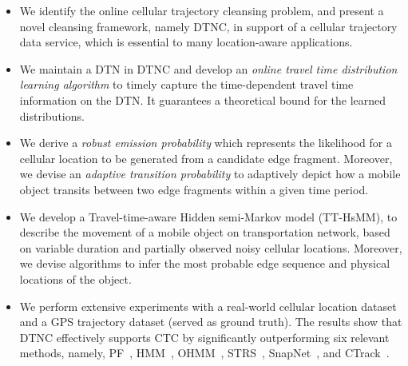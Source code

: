 \documentclass{vldb}
\begin{document}
	
	\begin{itemize}
		\setlength\itemsep{0em}
		\item We identify the online cellular trajectory cleansing problem, and present a novel cleansing framework, namely DTNC, in support of a cellular trajectory data service, which is essential to many location-aware applications.
		\item We maintain a DTN in DTNC and develop an {\it online travel time distribution learning algorithm} to timely capture the time-dependent travel time information on the DTN.
		It guarantees a theoretical bound for the learned distributions.
		\item We derive a {\em robust emission probability} which represents the likelihood for a cellular location to be generated from a candidate edge fragment. Moreover, we devise an {\em adaptive transition probability} to adaptively depict how a mobile object transits between two edge fragments within a given time period. 
		\item We develop a Travel-time-aware Hidden semi-Markov model (TT-HsMM), to describe the movement of a mobile object on transportation network, based on variable duration and partially observed noisy cellular locations. Moreover, we devise algorithms to infer the most probable edge sequence and physical locations of the object.
		\item We perform extensive experiments with a real-world cellular location dataset and a GPS trajectory dataset (served as ground truth). The results show that DTNC effectively supports CTC by significantly outperforming six relevant methods, namely, PF~\cite{kempinska2016probabilistic}, HMM~\cite{newson2009hidden}, OHMM~\cite{goh2012online}, STRS~\cite{DBLP:conf/kdd/WuMSZZCW16}, SnapNet~\cite{mohamed2016accurate}, and CTrack~\cite{thiagarajan2011accurate}.
	\end{itemize}  
	
	
\end{document}
